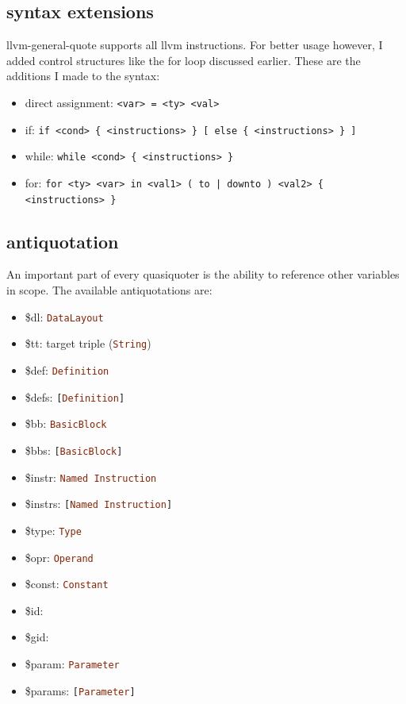 \documentclass[a4paper,bibliography=totocnumbered,parskip,headsepline]{scrbook}
\begin{document}
\subsection{syntax extensions}
llvm-general-quote supports all llvm instructions.
For better usage however, I added control structures like the for loop discussed earlier.
These are the additions I made to the syntax:
\begin{itemize}[noitemsep]
 \item direct assignment: \lstinline!<var> = <ty> <val>!
 \item if: \lstinline!if <cond> { <instructions> } [ else { <instructions> } ]!
 \item while: \lstinline!while <cond> { <instructions> }!
 \item for: \lstinline!for <ty> <var> in <val1> ( to | downto ) <val2> { <instructions> }!
\end{itemize}

\subsection{antiquotation}
An important part of every quasiquoter is the ability to reference other variables in scope.
The available antiquotations are:
\begin{itemize}[noitemsep]
\item \$dl: \lstinline[language=haskell]!DataLayout!
\item \$tt: target triple (\lstinline[language=haskell]!String!)
\item \$def: \lstinline[language=haskell]!Definition!
\item \$defs: \lstinline[language=haskell]![Definition]!
\item \$bb: \lstinline[language=haskell]!BasicBlock!
\item \$bbs: \lstinline[language=haskell]![BasicBlock]!
\item \$instr: \lstinline[language=haskell]!Named Instruction!
\item \$instrs: \lstinline[language=haskell]![Named Instruction]!
\item \$type: \lstinline[language=haskell]!Type!
\item \$opr: \lstinline[language=haskell]!Operand!
\item \$const: \lstinline[language=haskell]!Constant!
\item \$id: 
\item \$gid: 
\item \$param: \lstinline[language=haskell]!Parameter!
\item \$params: \lstinline[language=haskell]![Parameter]!
\end{itemize}
\end{document}
